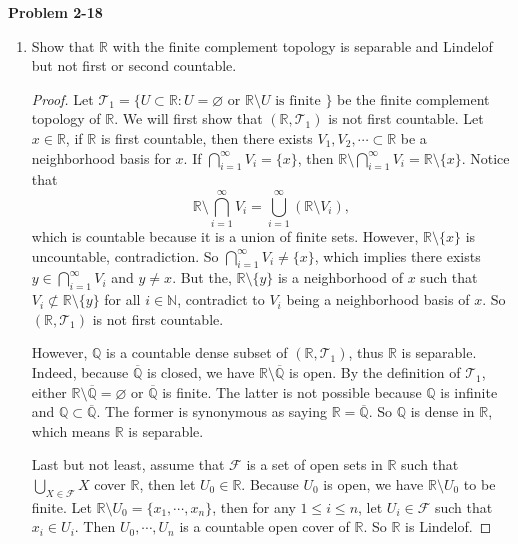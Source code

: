 \documentclass[12pt, a4paper]{article}
\theoremstyle{plain}
\newcommand{\N}{\mathbb{N}}
\newcommand{\Q}{\mathbb{Q}}
\newcommand{\R}{\mathbb{R}}
\newcommand{\F}{\mathcal{F}}
\newcommand{\T}{\mathcal{T}}
\newenvironment{problem}[2][Problem]
    { \begin{mdframed}[backgroundcolor=gray!20] \textbf{#1 #2} \\}
    {  \end{mdframed}}
\begin{document}
\begin{problem}{2-18}
\begin{enumerate}[label=(\alph*)]
\begin{proof}
	Since $\{x\}$ is open for all $x\in \R\setminus\{0\}$, $\{x\}$ must be in the basis for $\R$ for all $x\in\R\setminus\{0\}$. So any basis for $\R$ is uncountable or $\R$ is not second countable.
	
	Now we will show that the only dense subsets of $\R$ are $\R$ and $\R\setminus\{0\}$. It's not hard to see that these two sets are dense in $\R$ since their closure must contain $0$. If $E\subset \R$ is neither $\R$ or $\R\setminus\{0\}$, then $E\cup\{0\}\neq \R$. But $E\cup\{0\}$ is closed, thus $E$ is not dense in $\R$. Notice that both $\R$ and $\R\setminus\{0\}$ are uncountable, thus $\R$ is not separable. 
	\end{proof}

\item Show that $\R$ with the finite complement topology is separable and Lindelof but not first or second countable.
	\begin{proof}
	Let $\T_1=\{U\subset \R:U=\varnothing\text{ or }\R\setminus U\text{ is finite }\}$ be the finite complement topology of $\R$. We will first show that $(\R,\T_1)$ is not first countable. Let $x\in \R$, if $\R$ is first countable, then there exists $V_1,V_2,\cdots\subset \R$ be a neighborhood basis for $x$. If $\bigcap_{i=1}^{\infty}V_i=\{x\}$, then $\R\setminus\bigcap_{i=1}^{\infty}V_i=\R\setminus\{x\}$. Notice that
	\[
	\R\setminus\bigcap_{i=1}^{\infty}V_i = \bigcup_{i=1}^{\infty}(\R\setminus V_i),
	\]
	which is countable because it is a union of finite sets. However, $\R\setminus\{x\}$ is uncountable, contradiction. So $\bigcap_{i=1}^{\infty}V_i\neq \{x\}$, which implies there exists $y\in \bigcap_{i=1}^{\infty}V_i$ and $y\neq x$. But the, $\R\setminus\{y\}$ is a neighborhood of $x$ such that $V_i\not\subset \R\setminus\{y\}$ for all $i\in\N$, contradict to $V_i$ being a neighborhood basis of $x$. So $(\R,\T_1)$ is not first countable.
	
	However, $\Q$ is a countable dense subset of $(\R,\T_1)$, thus $\R$ is separable. Indeed, because $\overline{\Q}$ is closed, we have $\R\setminus\overline{\Q}$ is open. By the definition of $\T_1$, either $\R\setminus\overline{\Q}=\varnothing$ or $\overline{\Q}$ is finite. The latter is not possible because $\Q$ is infinite and $\Q\subset \overline{\Q}$. The former is synonymous as saying $\R=\overline{\Q}$. So $\Q$ is dense in $\R$, which means $\R$ is separable.
	
	Last but not least, assume that $\F$ is a set of open sets in $\R$ such that $\bigcup_{X\in\F}X$ cover $\R$, then let $U_0\in \R$. Because $U_0$ is open, we have $\R\setminus U_0$ to be finite. Let $\R\setminus U_0=\{x_1,\cdots,x_n\}$, then for any $1\leq i\leq n$, let $U_i\in \F$ such that $x_i\in U_i$. Then $U_0,\cdots,U_n$ is a countable open cover of $\R$. So $\R$ is Lindelof.
	\end{proof}
\end{enumerate}
\end{problem}
\end{document}

